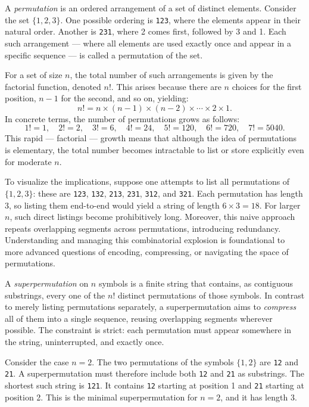 A \emph{permutation} is an ordered arrangement of a set of distinct elements. Consider the set \(\{1, 2, 3\}\). One possible ordering is \texttt{123}, where the elements appear in their natural order. Another is \texttt{231}, where 2 comes first, followed by 3 and 1. Each such arrangement — where all elements are used exactly once and appear in a specific sequence — is called a permutation of the set.

For a set of size \(n\), the total number of such arrangements is given by the factorial function, denoted \(n!\). This arises because there are \(n\) choices for the first position, \(n-1\) for the second, and so on, yielding:
\[
n! = n \times (n-1) \times (n-2) \times \cdots \times 2 \times 1.
\]
In concrete terms, the number of permutations grows as follows:
\[
1! = 1,\quad 2! = 2,\quad 3! = 6,\quad 4! = 24,\quad 5! = 120,\quad 6! = 720,\quad 7! = 5040.
\]
This rapid — factorial — growth means that although the idea of permutations is elementary, the total number becomes intractable to list or store explicitly even for moderate \(n\).

To visualize the implications, suppose one attempts to list all permutations of \(\{1, 2, 3\}\): these are \texttt{123}, \texttt{132}, \texttt{213}, \texttt{231}, \texttt{312}, and \texttt{321}. Each permutation has length 3, so listing them end-to-end would yield a string of length \(6 \times 3 = 18\). For larger \(n\), such direct listings become prohibitively long. Moreover, this naive approach repeats overlapping segments across permutations, introducing redundancy. Understanding and managing this combinatorial explosion is foundational to more advanced questions of encoding, compressing, or navigating the space of permutations.

A \emph{superpermutation} on \(n\) symbols is a finite string that contains, as contiguous substrings, every one of the \(n!\) distinct permutations of those symbols. In contrast to merely listing permutations separately, a superpermutation aims to \emph{compress} all of them into a single sequence, reusing overlapping segments wherever possible. The constraint is strict: each permutation must appear somewhere in the string, uninterrupted, and exactly once.

Consider the case \(n = 2\). The two permutations of the symbols \(\{1, 2\}\) are \texttt{12} and \texttt{21}. A superpermutation must therefore include both \texttt{12} and \texttt{21} as substrings. The shortest such string is \texttt{121}. It contains \texttt{12} starting at position 1 and \texttt{21} starting at position 2. This is the minimal superpermutation for \(n = 2\), and it has length 3.

